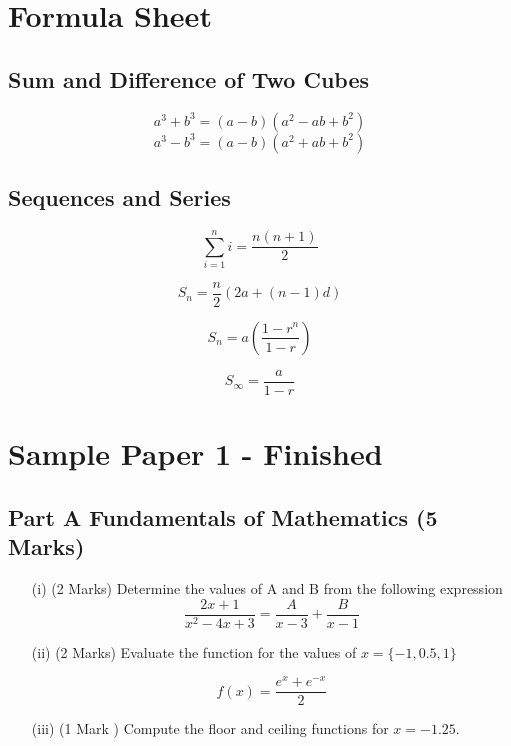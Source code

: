 \documentclass[]{article}
\begin{document}

\newpage


\LARGE
\section*{Formula Sheet}

\subsection*{Sum and Difference of Two Cubes}
\[ a^3 + b^3 = (a-b)(a^2 - ab + b^2)\]
\[ a^3 - b^3 = (a-b)(a^2 + ab + b^2)\]
\subsection*{Sequences and Series}
\[ \sum_{i=1}^{n} i = \frac{n(n+1)}{2}\]

\[ S_n = \frac{n}{2} \left(2a + (n-1) d \right)\]

\[ S_n = a\left(\frac{1-r^n}{1-r}\right)\]

\[ S_\infty = \frac{a}{1-r}\]
\newpage

\section*{Sample Paper 1 - Finished }

\subsection*{Part A Fundamentals of Mathematics (5 Marks) } %

\begin{itemize}

	\item[(i)] (2 Marks) Determine the values of A and B from the following expression
 \[  \frac{2x + 1}{x^2 - 4x + 3} = \frac{A}{x-3} + \frac{B}{x-1}\]


	\item[(ii)] (2 Marks) Evaluate the function for the values of  $ x = \{-1, 0.5 , 1 \}$

\[  f(x) = \frac{e^x + e^{-x} }{2} \]


\item[(iii)] (1 Mark )  Compute the floor and ceiling functions for $x= -1.25$.
\end{itemize}
\end{document}
